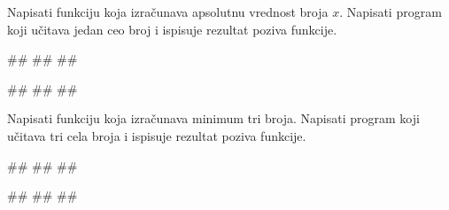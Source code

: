 \begin{Exercise}[label=p1.4_02] 
Napisati funkciju  koja
izračunava apsolutnu vrednost broja $x$. Napisati program koji učitava
jedan ceo broj i ispisuje rezultat poziva funkcije.

\begin{miditest}
\begin{upotreba}{1}
#\naslovInt#
##
##
\end{upotreba}
\end{miditest}
\begin{miditest}
\begin{upotreba}{2}
#\naslovInt#
##
##
\end{upotreba}
\end{miditest}

\end{Exercise}
\ifresenja 
\begin{Answer}[ref=p1.4_02]
\end{Answer} 
\fi


\begin{Exercise}[label=p1.4_01] 
Napisati funkciju  koja izračunava
minimum tri broja. Napisati program koji učitava tri cela broja i
ispisuje rezultat poziva funkcije.

\begin{miditest}
\begin{upotreba}{1}
#\naslovInt#
##
##
\end{upotreba}
\end{miditest}
\begin{miditest}
\begin{upotreba}{2}
#\naslovInt#
##
##
\end{upotreba}
\end{miditest}
\end{Exercise}
\ifresenja 
\begin{Answer}[ref=p1.4_01]
\end{Answer} 
\fi



